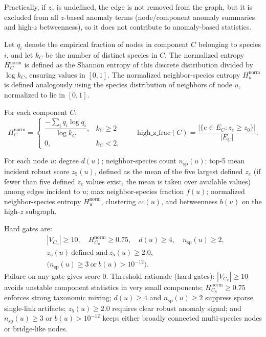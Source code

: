 \documentclass[11pt]{article}
\begin{document}
Practically, if $z_e$ is undefined, the edge is not removed from the graph, but it is excluded from all $z$-based anomaly terms (node/component anomaly summaries and high-$z$ betweenness), so it does not contribute to anomaly-based statistics.
\vspace{0.5em}

Let $q_i$ denote the empirical fraction of nodes in component $C$ belonging to species $i$, and let $k_C$ be the number of distinct species in $C$. 
The normalized entropy $H_C^{\mathrm{norm}}$ is defined as the Shannon entropy of this discrete distribution divided by $\log k_C$, ensuring values in $[0,1]$.
The normalized neighbor-species entropy $H_u^{\mathrm{norm}}$ is defined analogously using the species distribution of neighbors of node $u$, normalized to lie in $[0,1]$.

For each component $C$:
\begin{equation}
H_C^{\mathrm{norm}}=
\begin{cases}
\dfrac{-\sum_i q_i\log q_i}{\log k_C}, & k_C\ge 2\\
0, & k_C<2,
\end{cases}
\qquad
\mathrm{high\_z\_frac}(C)=\frac{|\{e\in E_C:z_e\ge z_0\}|}{|E_C|}.
\end{equation}
\vspace{0.5em}

For each node $u$: degree $d(u)$; neighbor-species count $n_{\mathrm{sp}}(u)$; top-5 mean incident robust score $z_5(u)$, defined as the mean of the five largest defined $z_e$ (if fewer than five defined $z_e$ values exist, the mean is taken over available values) among edges incident to $u$; max neighbor-species fraction $f(u)$; normalized neighbor-species entropy $H_u^{\mathrm{norm}}$, clustering $cc(u)$, and betweenness $b(u)$ on the high-$z$ subgraph.

Hard gates are:
\begin{equation}
\begin{aligned}
&|V_{C_u}|\ge 10,\quad H_{C_u}^{\mathrm{norm}}\ge 0.75,\quad d(u)\ge 4,\quad n_{\mathrm{sp}}(u)\ge 2,\\
&z_5(u)\ \text{defined and}\ z_5(u)\ge 2.0,\\
&\big(n_{\mathrm{sp}}(u)\ge 3\ \text{or}\ b(u)>10^{-12}\big).
\end{aligned}
\end{equation}
Failure on any gate gives score $0$.
Threshold rationale (hard gates): $|V_{C_u}|\ge 10$ avoids unstable component statistics in very small components; $H_{C_u}^{\mathrm{norm}}\ge 0.75$ enforces strong taxonomic mixing; $d(u)\ge 4$ and $n_{\mathrm{sp}}(u)\ge 2$ suppress sparse single-link artifacts; $z_5(u)\ge 2.0$ requires clear robust anomaly signal; and $n_{\mathrm{sp}}(u)\ge 3$ or $b(u)>10^{-12}$ keeps either broadly connected multi-species nodes or bridge-like nodes.
\vspace{0.5em}
\end{document}
